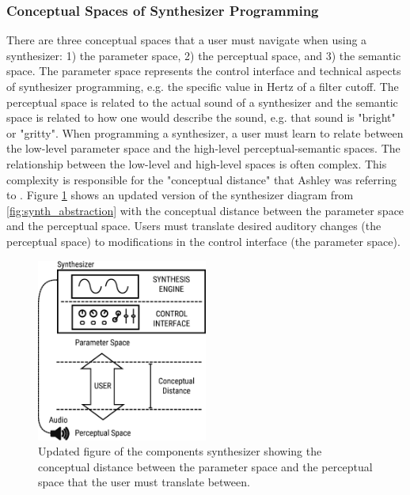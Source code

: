 \subsubsection{Conceptual Spaces of Synthesizer Programming}
There are three conceptual spaces that a user must navigate when using a synthesizer: 1) the parameter space, 2) the perceptual space, and 3) the semantic space. The parameter space represents the control interface and technical aspects of synthesizer programming, e.g. the specific value in Hertz of a filter cutoff. The perceptual space is related to the actual sound of a synthesizer and the semantic space is related to how one would describe the sound, e.g. that sound is "bright" or "gritty". When programming a synthesizer, a user must learn to relate between the low-level parameter space and the high-level perceptual-semantic spaces. The relationship between the low-level and high-level spaces is often complex. This complexity is responsible for the "conceptual distance" that Ashley was referring to \cite{ashley1986knowledge}. Figure \ref{fig:synth_conceptual_dist} shows an updated version of the synthesizer diagram from \ref{fig:synth_abstraction} with the conceptual distance between the parameter space and the perceptual space. Users must translate desired auditory changes (the perceptual space) to modifications in the control interface (the parameter space).

\begin{figure}[ht]
    \centering
    \includegraphics[width=0.5\textwidth]{figures/background/synth_conceptual_dist.eps}
    \caption{Updated figure of the components synthesizer showing the conceptual distance between the parameter space and the perceptual space that the user must translate between.}
    \label{fig:synth_conceptual_dist}
\end{figure}

